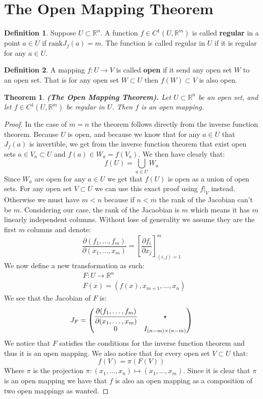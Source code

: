 \documentclass[11pt,a4paper]{article}
\theoremstyle{definition}
\newtheorem{definition}{Definition}[section]
\theoremstyle{plain}
\newtheorem{theorem}{Theorem}[section]
\newcommand{\R}{\mathbb{R}}
\renewcommand{\tt}[1]{\textnormal{\textbf{(#1).}}} %
\begin{document}
	\section{The Open Mapping Theorem}
	\begin{definition}
		Suppose $U \subset \R^n$. A function $f \in C^1(U, \R^m)$ is called 
		\textbf{regular} in a point $a \in U$ if $\mathrm{rank}J_f(a) = m$.
		The function is called regular in $U$ if it is regular for any
		$a \in U$.
	\end{definition}
	\begin{definition}
		A mapping $f \colon U \to V$ is called \textbf{open} if it send
		any open set $W$ to an open set. That is for any open set 
		$W \subset U$ then $f(W) \subset V$ is also open.
	\end{definition}
	\begin{theorem}
		\tt{The Open Mapping Theorem}
		Let $U \subset \R^n$ be an open set, and let $f \in C^1(U,\R^m)$ be 
		regular in $U$. Then $f$ is an open mapping.
	\end{theorem}
	\begin{proof}
		In the case of $m = n$ the theorem follows directly from the inverse
		function theorem. Because $U$ is open, and because we know that
		for any $a \in U$ that $J_f(a)$ is invertible, we get from the
		inverse function theorem that exist open sets $a \in V_a \subset U$ 
		and $f(a) \in W_a = f(V_a)$. We then have clearly that:
		\[
			f(U) = \bigcup_{a \in U} W_a
		\]
		Since $W_a$ are open for any $a \in U$ we get that $f(U)$ is open
		as a union of open sets. For any open set $V \subset U$ we can
		use this exact proof using $f\vert_V$ instead. \\
		Otherwise we must have $m < n$ because if $n < m$ the rank of the
		Jacobian can't be $m$. Considering our case, the rank of the Jacaobian
		is $m$ which means it has $m$ linearly independent columns. Without
		lose of generality we assume they are the first $m$ columns and 
		denote:
		\[
			\frac{\partial(f_1,\dots,f_m)}{\partial(x_1,\dots,x_m)} = 
			\left[\frac{\partial f_i}{\partial x_j}\right]_{(i,j)=1}^{m}
		\]
		We now define a new transformation as such:
		\begin{align*}
			&F \colon U \to \R^n \\
			&F(x) = (f(x),x_{m+1},\dots,x_{n})
		\end{align*}
		We see that the Jacobian of $F$ is:
		\[
			J_F = \begin{pmatrix}
	\cfrac{\partial(f_1,\dots,f_m)}{\partial(x_1,\dots,x_m)} & \star \\
	0 & I_{(n-m) \times (n-m)}\\
				\end{pmatrix}
		\]
		We notice that $F$ satisfies the conditions for the inverse function
		theorem and thus it is an open mapping. We also notice that for
		every open set $V \subset U$ that:
		\[
			f(V) = \pi(F(V))
		\]
		Where $\pi$ is the projection 
		$\pi \colon (x_1,\dots,x_n) \mapsto (x_1,\dots,x_m)$. Since
		it is clear that $\pi$ is an open mapping we have that $f$
		is also an open mapping as a composition of two open mappings as
		wanted.
	\end{proof}
	
\end{document}
